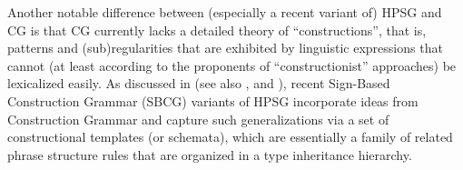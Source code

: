 \documentclass[output=paper
                ,modfonts
                ,nonflat
	        ,collection
	        ,collectionchapter
	        ,collectiontoclongg
 	        ,biblatex
                ,babelshorthands
                ,newtxmath
                ,draftmode
                ,colorlinks, citecolor=brown
]{./langsci/langscibook}
\begin{document}



Another notable difference between (especially a recent variant of)
HPSG and CG is that CG currently lacks a detailed theory of
``constructions'', 
that is, patterns and (sub)regularities that are
exhibited by linguistic expressions that cannot (at least according to
the proponents of ``constructionist'' approaches) be lexicalized easily.
As discussed in  (see also
\citealt{Sag97a}, \citealt{Fillmore99a} and \citealt{GSag2000a-u}),  recent Sign-Based Construction
Grammar (SBCG) variants of HPSG \citep{SBK2012a} 
incorporate ideas from Construction Grammar 
\citep{FKoC88a} and capture such
generalizations via a set of constructional templates (or schemata),
which are essentially a family of related phrase structure rules that
are organized in a type inheritance hierarchy.
\end{document}
